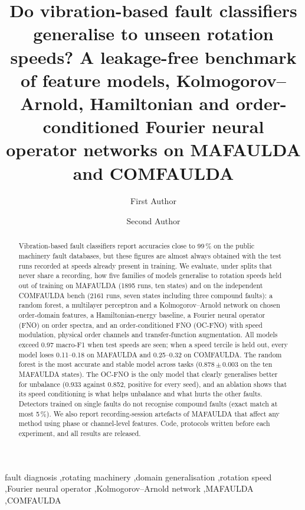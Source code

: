 \documentclass[preprint,review,12pt,authoryear=false]{elsarticle}
\begin{document}
\begin{frontmatter}

\title{Do vibration-based fault classifiers generalise to unseen rotation speeds? A leakage-free benchmark of
feature models, Kolmogorov--Arnold, Hamiltonian and order-conditioned Fourier neural operator networks on MAFAULDA
and COMFAULDA}

\author[a]{First Author}
\author[a]{Second Author}

\begin{abstract}
Vibration-based fault classifiers report accuracies close to 99\,\% on the public machinery fault databases, but
these figures are almost always obtained with the test runs recorded at speeds already present in training. We
evaluate, under splits that never share a recording, how five families of models generalise to rotation speeds held
out of training on MAFAULDA (1895 runs, ten states) and on the independent COMFAULDA bench (2161 runs, seven states
including three compound faults): a random forest, a multilayer perceptron and a Kolmogorov--Arnold network on chosen
order-domain features, a Hamiltonian-energy baseline, a Fourier neural operator (FNO) on order spectra, and an
order-conditioned FNO (OC-FNO) with speed modulation, physical order channels and transfer-function augmentation.
All models exceed 0.97 macro-F1 when test speeds are seen; when a speed tercile is held out, every model loses 0.11--0.18
on MAFAULDA and 0.25--0.32 on COMFAULDA. The random forest is the most accurate and stable model across tasks
(0.878\,$\pm$\,0.003 on the ten MAFAULDA states). The OC-FNO is the only model that clearly generalises better for
unbalance (0.933 against 0.852, positive for every seed), and an ablation shows that its speed conditioning is what
helps unbalance and what hurts the other faults. Detectors trained on single faults do not recognise compound faults
(exact match at most 5\,\%). We also report recording-session artefacts of MAFAULDA that affect any method using
phase or channel-level features. Code, protocols written before each experiment, and all results are released.
\end{abstract}

\begin{keyword}
fault diagnosis \sep rotating machinery \sep domain generalisation \sep rotation speed \sep Fourier neural operator
\sep Kolmogorov--Arnold network \sep MAFAULDA \sep COMFAULDA
\end{keyword}

\end{frontmatter}
\end{document}
